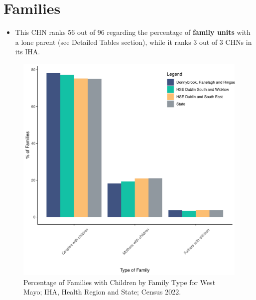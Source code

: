 \documentclass{article}
\begin{document}
\section{Families}\label{sect:Fam}
\begin{itemize}
\item This CHN ranks  56 out of 96 regarding the percentage of \textbf{family units} with a lone parent (see Detailed Tables section), while it ranks   3 out of 3 CHNs in its IHA.
\end{itemize}
\begin{figure}[H]
	\centering
	\includegraphics[width = 150mm]{../figures/FamED.pdf}
	\caption{Percentage of Families with Children by Family Type for West Mayo; IHA, Health Region and State; Census 2022.}
	\label{fig:vbnv}
	\end{figure}
	
\end{document}
